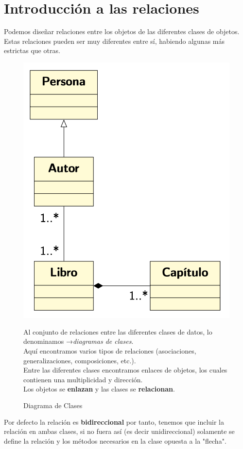 \chapter{Introducción a las relaciones}
Podemos diseñar relaciones entre los objetos de las diferentes clases de objetos.
Estas relaciones pueden ser muy diferentes entre sí, habiendo algunas más estrictas
que otras.
\vspace*{0.2cm}
\begin{figure}[h]
  \begin{minipage}{0.4\textwidth}
    \includegraphics[width=\textwidth]{Imagenes/intro1.png}
    \caption{Diagrama de Clases}
  \end{minipage}
  \begin{minipage}{0.6\textwidth}
      \vspace{-6\baselineskip} %
    Al conjunto de relaciones entre las diferentes clases de datos, lo denominamos →\textit{diagramas de clases}.\\
    
	Aquí encontramos varios tipos de relaciones (asociaciones, generalizaciones, composiciones, etc.).\\
	
	Entre las diferentes clases encontramos enlaces de objetos, los cuales contienen una multiplicidad y dirección.\\
	
	Los objetos se \textbf{enlazan} y las clases se \textbf{relacionan}.
  \end{minipage}
  
\end{figure}
Por defecto la relación es \textbf{bidireccional} por tanto, tenemos que incluir la relación en ambas clases, si no fuera así (es decir unidireccional) solamente se define la relación y los métodos necesarios en la clase opuesta a la "flecha".